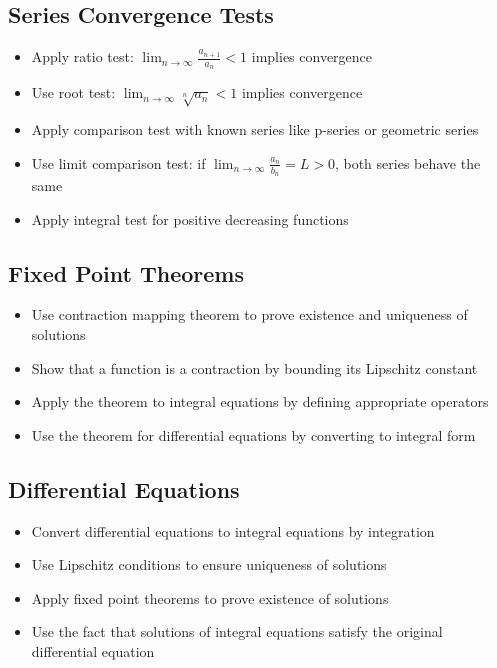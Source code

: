 \subsection*{Series Convergence Tests}
\begin{itemize}
\item Apply ratio test: $\lim_{n\to\infty} \frac{a_{n+1}}{a_n} < 1$ implies convergence
\item Use root test: $\lim_{n\to\infty} \sqrt[n]{a_n} < 1$ implies convergence
\item Apply comparison test with known series like p-series or geometric series
\item Use limit comparison test: if $\lim_{n\to\infty} \frac{a_n}{b_n} = L > 0$, both series behave the same
\item Apply integral test for positive decreasing functions
\end{itemize}

\subsection*{Fixed Point Theorems}
\begin{itemize}
\item Use contraction mapping theorem to prove existence and uniqueness of solutions
\item Show that a function is a contraction by bounding its Lipschitz constant
\item Apply the theorem to integral equations by defining appropriate operators
\item Use the theorem for differential equations by converting to integral form
\end{itemize}

\subsection*{Differential Equations}
\begin{itemize}
\item Convert differential equations to integral equations by integration
\item Use Lipschitz conditions to ensure uniqueness of solutions
\item Apply fixed point theorems to prove existence of solutions
\item Use the fact that solutions of integral equations satisfy the original differential equation
\end{itemize}
